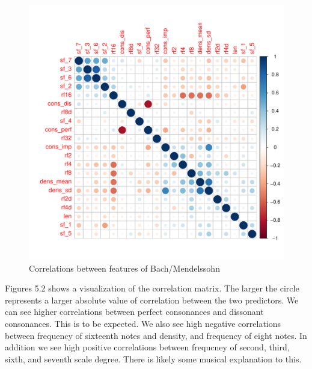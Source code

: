 \documentclass[12pt,twoside]{reedthesis}
\theoremstyle{definition}
\theoremstyle{definition}
\theoremstyle{definition}
\theoremstyle{remark}
\begin{document}
\begin{figure}[H]
\centering
\includegraphics[scale = .5]{images/cor_circles_b.pdf}
\caption{Correlations between features of Bach/Mendelssohn}
\label{subd}
\end{figure}
Figures 5.2 shows a visualization of the correlation matrix. The larger
the circle represents a larger absolute value of correlation between the
two predictors. We can see higher correlations between perfect
consonances and dissonant consonances. This is to be expected. We also
see high negative correlations between frequency of sixteenth notes and
density, and frequency of eight notes. In addition we see high positive
correlations between frequcney of second, third, sixth, and seventh
scale degree. There is likely some musical explanation to this.
\end{document}
